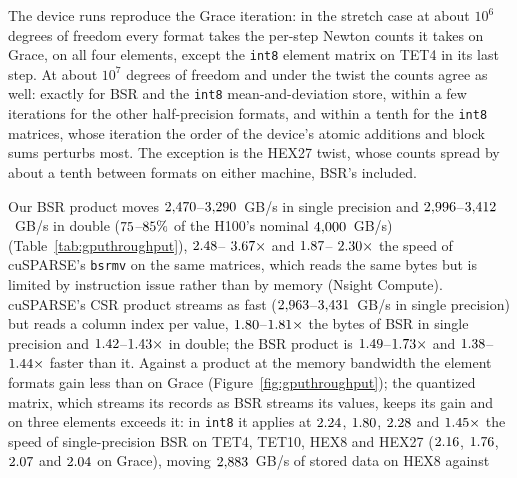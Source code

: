 \documentclass[sigconf,balance=false]{acmart}
\begin{document}
The device runs reproduce the Grace iteration: in the stretch case at about $10^6$ degrees of
freedom every format takes the per-step Newton counts it takes on Grace, on all four elements, except
the \texttt{int8} element matrix on TET4 in its last step.  At about $10^7$ degrees of freedom and
under the twist the counts agree as well: exactly for BSR and the \texttt{int8} mean-and-deviation
store, within a few iterations for the other half-precision formats, and within a tenth for the
\texttt{int8} matrices, whose iteration the order of the device's atomic additions and block sums
perturbs most.  The exception is the HEX27 twist, whose counts spread by about a tenth between
formats on either machine, BSR's included.

Our BSR product moves $2{,}470$--$3{,}290$~GB/s in
single precision and $2{,}996$--$3{,}412$~GB/s in double
($75$--$85\%$ of the H100's nominal $4{,}000$~GB/s)
(Table~\ref{tab:gputhroughput}), $2.48$--%
$3.67\times$ and $1.87$--%
$2.30\times$ the speed of cuSPARSE's \texttt{bsrmv} on the same
matrices, which reads the same bytes but is limited by instruction issue rather than by memory
(Nsight Compute).  cuSPARSE's CSR product streams as fast
($2{,}963$--$3{,}431$~GB/s in single precision) but reads a column index
per value, $1.80$--$1.81\times$ the bytes of BSR in
single precision and $1.42$--$1.43\times$ in double;
the BSR product is $1.49$--$1.73\times$ and
$1.38$--$1.44\times$ faster than it.  Against a
product at the memory bandwidth the element formats gain less than on Grace
(Figure~\ref{fig:gputhroughput}); the quantized matrix, which streams its records as BSR streams its
values, keeps its gain and on three elements exceeds it: in \texttt{int8} it applies at $2.24$, $1.80$,
$2.28$ and $1.45\times$ the speed of
single-precision BSR on TET4, TET10, HEX8 and HEX27 ($2.16$,
$1.76$, $2.07$ and $2.04$ on
Grace), moving $2{,}883$~GB/s of stored data on HEX8 against
\end{document}
